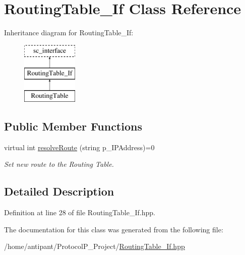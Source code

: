 \hypertarget{classRoutingTable__If}{\section{Routing\-Table\-\_\-\-If Class Reference}
\label{classRoutingTable__If}
}
Inheritance diagram for Routing\-Table\-\_\-\-If\-:\begin{figure}[H]
\begin{center}
\leavevmode
\includegraphics[height=3.000000cm]{classRoutingTable__If}
\end{center}
\end{figure}
\subsection*{Public Member Functions}
\begin{DoxyCompactItemize}
\item 
\hypertarget{classRoutingTable__If_af6210909231b656e415fa3c748db6e4f}{virtual int \hyperlink{classRoutingTable__If_af6210909231b656e415fa3c748db6e4f}{resolve\-Route} (string p\-\_\-\-I\-P\-Address)=0}\label{classRoutingTable__If_af6210909231b656e415fa3c748db6e4f}

\begin{DoxyCompactList}\small\item\em Set new route to the Routing Table. \end{DoxyCompactList}\end{DoxyCompactItemize}


\subsection{Detailed Description}


Definition at line 28 of file Routing\-Table\-\_\-\-If.\-hpp.



The documentation for this class was generated from the following file\-:\begin{DoxyCompactItemize}
\item 
/home/antipant/\-Protocol\-P\-\_\-\-Project/\hyperlink{RoutingTable__If_8hpp}{Routing\-Table\-\_\-\-If.\-hpp}\end{DoxyCompactItemize}
